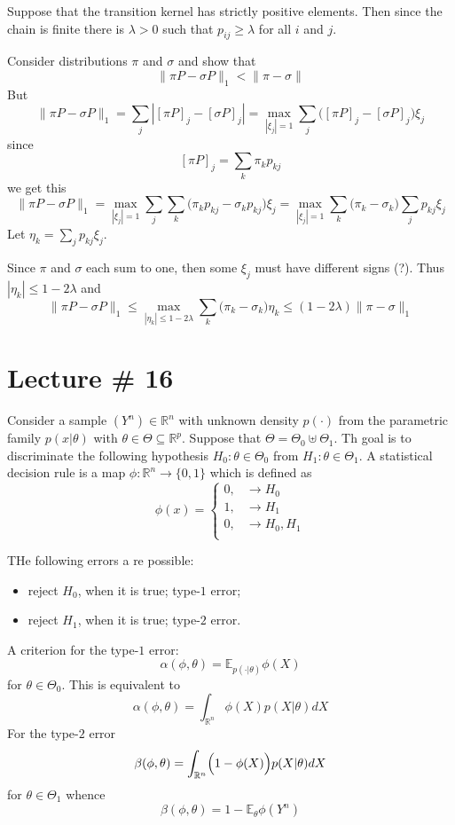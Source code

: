 \documentclass[a4paper]{article}
\newcommand{\Real}{\mathbb{R}}
\newcommand{\ex}{\mathbb{E}}
\begin{document}
Suppose that the transition kernel has strictly positive elements. Then since
the chain is finite there is $\lambda>0$ such that $p_{ij}\geq \lambda$ for all
$i$ and $j$.

Consider distributions $\pi$ and $\sigma$ and show that
\[\|\pi P-\sigma P\|_1 < \|\pi - \sigma \|\]
But 
\[
\|\pi P-\sigma P\|_1
= \sum_j | [\pi P]_j - [\sigma P]_j |
= \max_{|\xi_j|=1}  \sum_j \bigl([\pi P]_j - [\sigma P]_j \bigr) \xi_j
\]
since 
\[ [\pi P]_j = \sum_k \pi_k p_{kj} \]
we get this
\[
\|\pi P-\sigma P\|_1
= \max_{|\xi_j|=1}  \sum_j\sum_k \bigl(\pi_k p_{kj} - \sigma_k p_{kj} \bigr) \xi_j
= \max_{|\xi_j|=1}  \sum_k\bigl(\pi_k - \sigma_k \bigr) \sum_j p_{kj} \xi_j
\]
Let $\eta_k=\sum_j p_{kj} \xi_j$.

Since $\pi$ and $\sigma$ each sum to one, then some $\xi_j$ must have different
signs (?). Thus $|\eta_k| \leq 1-2\lambda$ and
\[
\|\pi P-\sigma P\|_1
\leq \max_{|\eta_k|\leq 1-2\lambda} \sum_k\bigl(\pi_k - \sigma_k \bigr)\eta_k
\leq (1-2\lambda) \|\pi - \sigma\|_1
\]




\section{Lecture \# 16} %
\label{sec:lecture_16}

Consider a sample $(Y^n)\in \Real^n$ with unknown density $p(\cdot)$ from the parametric
family $p(x\rvert \theta)$ with $\theta\in \Theta\subseteq \Real^p$. Suppose that
$\Theta = \Theta_0\uplus \Theta_1$. Th goal is to discriminate the following hypothesis
$H_0: \theta\in \Theta_0$ from $H_1: \theta\in \Theta_1$.
 A statistical decision rule is a map $\phi:\Real^n \to\{0,1\}$ which is defined as
\[
\phi(x) = \begin{cases}
	0, &\to H_0\\
	1, &\to H_1\\
	0, &\to H_0,H_1\\
\end{cases}
\]

THe following errors a re possible:
\begin{itemize}
	\item reject $H_0$, when it is true; type-$1$ error;
	\item reject $H_1$, when it is true; type-$2$ error.
\end{itemize}
A criterion for the type-$1$ error:
\[\alpha(\phi, \theta) = \ex_{p(\cdot\rvert\theta)} \phi(X)\]
for $\theta\in \Theta_0$. This is equivalent to
\[\alpha(\phi, \theta) = \int_{\Real^n} \phi(X) p(X \rvert \theta) dX\]
For the type-$2$ error
\[\beta(\phi, \theta) = \int_{\Real^n} \Bigl(1-\phi(X)\Bigr) p(X \rvert \theta) dX\]
for $\theta\in \Theta_1$ whence
\[\beta(\phi, \theta) = 1-\ex_\theta \phi(Y^n)\]
\end{document}

